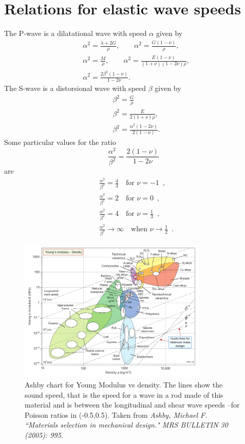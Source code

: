 \documentclass[12pt,letterpaper,landscape]{article}
\begin{document}
\section{Relations for elastic wave speeds}

The P-wave is a dilatational wave with speed $\alpha$ given by 
\begin{align*}
 & \alpha^{2}=\frac{\lambda+2G}{\rho},\qquad\alpha^{2}=\frac{G(1-\nu)}{\rho},\\
 & \alpha^{2}=\frac{M}{\rho},\qquad\alpha^{2}=\frac{E(1-\nu)}{(1+\nu)(1-2\nu)\rho},\\
 & \alpha^{2}=\frac{2\beta^{2}(1-\nu)}{1-2\nu}.
\end{align*}
 The S-wave is a distorsional wave with speed $\beta$ given by 
\begin{align*}
 & \beta^{2}=\frac{G}{\rho}\\
 & \beta^{2}=\frac{E}{2(1+\nu)\rho},\\
 & \beta^{2}=\frac{\alpha^{2}(1-2\nu)}{2(1-\nu)}.
\end{align*}
 Some particular values for the ratio 
\[
\frac{\alpha^{2}}{\beta^{2}}=\frac{2(1-\nu)}{1-2\nu}
\]
 are 
\begin{align*}
 & \frac{\alpha^{2}}{\beta^{2}}=\frac{4}{3}\quad\mbox{for }\nu=-1\enspace,\\
 & \frac{\alpha^{2}}{\beta^{2}}=2\quad\mbox{for }\nu=0\enspace,\\
 & \frac{\alpha^{2}}{\beta^{2}}=4\quad\mbox{for }\nu=\frac{1}{3}\enspace,\\
 & \frac{\alpha^{2}}{\beta^{2}}\rightarrow\infty\quad\mbox{when }\nu\rightarrow\frac{1}{2}\enspace.
\end{align*}

\begin{figure}[h]
\centering
\includegraphics[width=0.8\textwidth]{img/E_vs_density-vector.pdf} 
\caption{Ashby chart for Young Modulus vs density. The lines show the sound speed, that is the speed for a wave in a rod made of this material and is between the longitudinal and shear wave speeds --for Poisson ratios in (-0.5,0.5). Taken from \emph{Ashby, Michael F. ``Materials selection in mechanical design." MRS BULLETIN 30 (2005): 995.}}
\end{figure}
\end{document}
